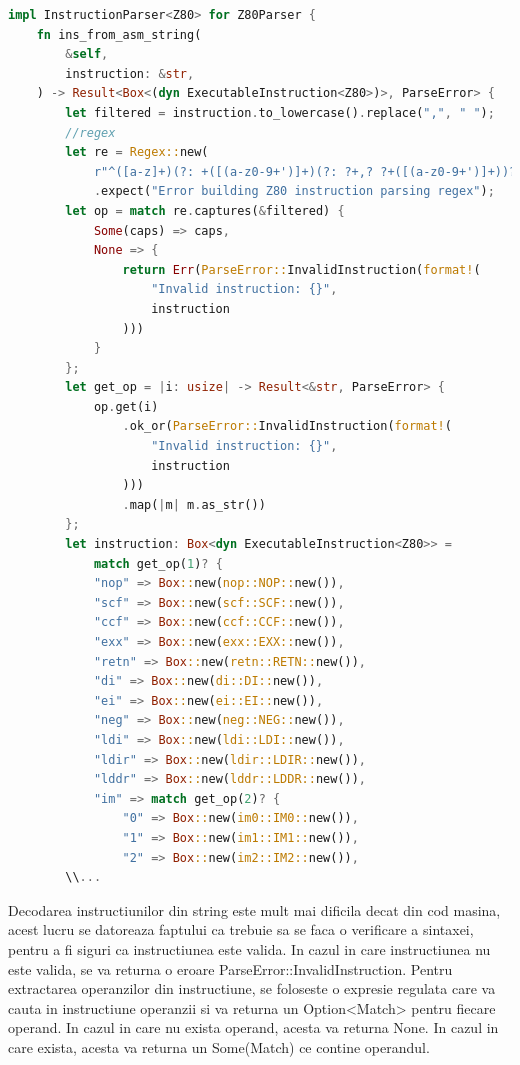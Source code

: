 \documentclass[titlepage,12pt]{article}
\DeclareRobustCommand{\code}[1]{{\ttfamily\small #1}}
\begin{document}
\begin{lstlisting}[language=Rust,caption={Sectiune decodor din string},label={lst:decoder-string}]
impl InstructionParser<Z80> for Z80Parser {
    fn ins_from_asm_string(
        &self,
        instruction: &str,
    ) -> Result<Box<(dyn ExecutableInstruction<Z80>)>, ParseError> {
        let filtered = instruction.to_lowercase().replace(",", " ");
        //regex
        let re = Regex::new(
            r"^([a-z]+)(?: +([(a-z0-9+')]+)(?: ?+,? ?+([(a-z0-9+')]+))?)?$")
            .expect("Error building Z80 instruction parsing regex");
        let op = match re.captures(&filtered) {
            Some(caps) => caps,
            None => {
                return Err(ParseError::InvalidInstruction(format!(
                    "Invalid instruction: {}",
                    instruction
                )))
            }
        };
        let get_op = |i: usize| -> Result<&str, ParseError> {
            op.get(i)
                .ok_or(ParseError::InvalidInstruction(format!(
                    "Invalid instruction: {}",
                    instruction
                )))
                .map(|m| m.as_str())
        };
        let instruction: Box<dyn ExecutableInstruction<Z80>> =
            match get_op(1)? {
            "nop" => Box::new(nop::NOP::new()),
            "scf" => Box::new(scf::SCF::new()),
            "ccf" => Box::new(ccf::CCF::new()),
            "exx" => Box::new(exx::EXX::new()),
            "retn" => Box::new(retn::RETN::new()),
            "di" => Box::new(di::DI::new()),
            "ei" => Box::new(ei::EI::new()),
            "neg" => Box::new(neg::NEG::new()),
            "ldi" => Box::new(ldi::LDI::new()),
            "ldir" => Box::new(ldir::LDIR::new()),
            "lddr" => Box::new(lddr::LDDR::new()),
            "im" => match get_op(2)? {
                "0" => Box::new(im0::IM0::new()),
                "1" => Box::new(im1::IM1::new()),
                "2" => Box::new(im2::IM2::new()),
        \\...
\end{lstlisting}

Decodarea instructiunilor din string este mult mai dificila decat din cod masina, acest lucru se datoreaza faptului ca trebuie sa se faca o verificare a sintaxei, pentru a fi siguri ca instructiunea este valida. In cazul in care instructiunea nu este valida, se va returna o eroare \code{ParseError::InvalidInstruction}.
Pentru extractarea operanzilor din instructiune, se foloseste o expresie regulata care va cauta in instructiune operanzii si va returna un \code{Option<Match>} pentru fiecare operand. In cazul in care nu exista operand, acesta va returna \code{None}. In cazul in care exista, acesta va returna un \code{Some(Match)} ce contine operandul.
\end{document}
